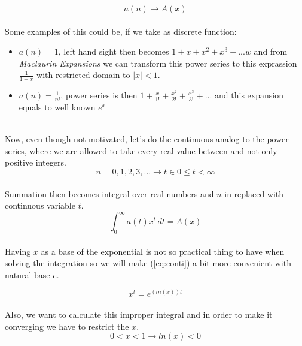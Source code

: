 \documentclass{article}
\begin{document}
\begin{equation}
    a(n) \rightarrow A(x)
\end{equation}
\\
Some examples of this could be, if we take as discrete function:
\begin{itemize}
    \item $a(n) = 1$, left hand sight then becomes $1 + x + x^2 + x^3 + ...w$ and from \textit{Maclaurin Expansions} we can transform this power series to this exprassion $\frac{1}{1-x}$ with restricted domain to $|x| < 1$.

    \item $a(n) = \frac{1}{n!}$, power series is then $1 + \frac{x}{1!} + \frac{x^2}{2!} + \frac{x^3}{3!} + ...$  and this expansion equals to well known $e^x$\\
    \\
\end{itemize}

Now, even though not motivated, let's do the continuous analog to the power series, where we are allowed to take every real value between and not only positive integers.\\
\begin{equation}
    n = 0,1,2,3,... \rightarrow t \in {0 \leq t < \infty}
\end{equation}\\

\noindent Summation then becomes integral over real numbers and $n$ in replaced with continuous variable $t$.\\ 

\begin{equation}
\label{eq:conti}
    \int_0^{\infty} a(t)x^t \, dt = A(x)
\end{equation}\\

\noindent Having $x$ as a base of the exponential is not so practical thing to have when solving the integration so we will make (\ref{eq:conti}) a bit more convenient with natural base $e$.

\begin{equation}
    x^t = e^{(ln(x))t}
\end{equation}\\

\noindent Also, we want to calculate this improper integral and in order to make it converging we have to restrict the $x$.\\
\begin{equation}
\label{eq:xrange}
    0 < x < 1 \rightarrow ln(x) < 0
\end{equation}
\end{document}
